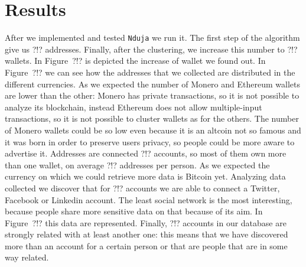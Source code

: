 \section{Results} \label{results}
After we implemented and tested \texttt{Nduja} we run it. The first step of the
algorithm give us ?!? addresses. Finally, after the clustering, we increase
this number to ?!? wallets. In Figure~?!? is depicted the increase of wallet we
found out. In Figure~?!? we can see how the addresses that we collected are
distributed in the different currencies. As we expected the number of Monero
and Ethereum wallets are lower than the other: Monero has private transactions,
so it is not possible to analyze its blockchain, instead Ethereum does not
allow multiple-input transactions, so it is not possible to cluster wallets as
for the others. The number of Monero wallets could be so low even because it is
an altcoin not so famous and it was born in order to preserve users privacy, so
people could be more aware to advertise it. Addresses are connected ?!?
accounts, so most of them own more than one wallet, on average ?!? addresses
per person. As we expected the currency on which we could retrieve more data is
Bitcoin yet. Analyzing data collected we discover that for ?!? accounts we are
able to connect a Twitter, Facebook or Linkedin account. The least social
network is the most interesting, because people share more sensitive data on
that because of its aim. In Figure~?!? this data are represented. Finally, ?!? accounts in our database are strongly related with at least another one: this means that we have discovered more than an account for a certain person or that are people that are in some way related.
